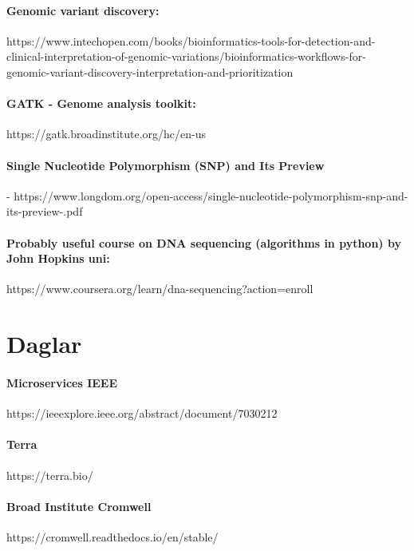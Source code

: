 \documentclass{article}
\begin{document}
\paragraph{Genomic variant discovery:}
https://www.intechopen.com/books/bioinformatics-tools-for-detection-and-clinical-interpretation-of-genomic-variations/bioinformatics-workflows-for-genomic-variant-discovery-interpretation-and-prioritization
\paragraph{GATK - Genome analysis toolkit:} https://gatk.broadinstitute.org/hc/en-us
\paragraph{Single Nucleotide Polymorphism (SNP) and Its Preview} - https://www.longdom.org/open-access/single-nucleotide-polymorphism-snp-and-its-preview-.pdf 
\paragraph{Probably useful course on DNA sequencing (algorithms in python) by John Hopkins uni:} https://www.coursera.org/learn/dna-sequencing?action=enroll




\section*{Daglar}
\paragraph{Microservices IEEE} https://ieeexplore.ieee.org/abstract/document/7030212
\paragraph{Terra} https://terra.bio/
\paragraph{Broad Institute Cromwell} https://cromwell.readthedocs.io/en/stable/
\end{document}
